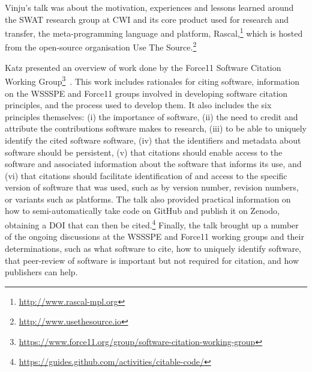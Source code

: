\documentclass[a4paper,UKenglish]{dagrep}
\begin{document}

Vinju's talk was about the motivation, experiences and lessons learned around the SWAT research group at CWI and its core product used for research and transfer, the meta-programming language and platform, Rascal,\footnote{\url{http://www.rascal-mpl.org}} which is hosted from the open-source organisation Use The Source.\footnote{\url{http://www.usethesource.io}}


Katz presented an overview of work done by the Force11 Software Citation Working Group\footnote{\url{https://www.force11.org/group/software-citation-working-group}}~\cite{10.7717/peerj-cs.86}.
This work includes rationales for citing software, information on the WSSSPE and Force11 groups involved in developing software citation principles, and the process used to develop them.
It also includes the six principles themselves:
(i) the importance of software, 
(ii) the need to credit and attribute the contributions software makes to research, 
(iii) to be able to uniquely identify the cited software software,
(iv) that the identifiers and metadata about software should be persistent,
(v) that citations should enable access to the software and associated information about the software that informs its use,
and
(vi) that citations should facilitate identification of and access to the specific version of software that was used, such as by version number, revision numbers, or variants such as platforms.
%
The talk also provided practical information on how to semi-automatically take code on GitHub and publish it on Zenodo, obtaining a DOI that can then be cited.\footnote{\url{https://guides.github.com/activities/citable-code/}}
Finally, the talk brought up a number of the ongoing discussions at the WSSSPE and Force11 working groups and their determinations, such as what software to cite, how to uniquely identify software, that peer-review of software is important but not required for citation, and how publishers can help.

\end{document}
